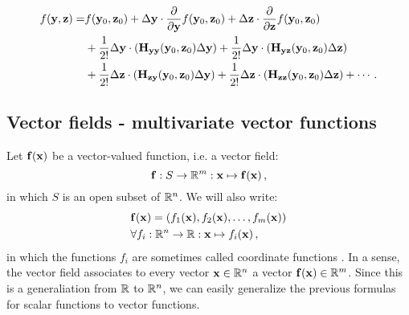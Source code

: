         \begin{equation}
            \begin{split}
                f(\vb{y}, \vb{z}) = &f(\vb{y}_0, \vb{z}_0) + \Delta \vb{y} \cdot \pdv{\vb{y}} f(\vb{y}_0, \vb{z}_0) + \Delta \vb{z} \cdot \pdv{\vb{z}} f(\vb{y}_0, \vb{z}_0) \\
                &+ \frac{1}{2!} \Delta \vb{y} \cdot (\vb{H}_{\vb{y} \vb{y}}(\vb{y}_0, \vb{z}_0) \Delta \vb{y}) + \frac{1}{2!} \Delta \vb{y} \cdot (\vb{H}_{\vb{y} \vb{z}}(\vb{y}_0, \vb{z}_0) \Delta \vb{z}) \\
                &+ \frac{1}{2!} \Delta \vb{z} \cdot (\vb{H}_{\vb{z} \vb{y}}(\vb{y}_0, \vb{z}_0) \Delta \vb{y}) + \frac{1}{2!} \Delta \vb{z} \cdot (\vb{H}_{\vb{z} \vb{z}}(\vb{y}_0, \vb{z}_0) \Delta \vb{z}) + \cdots \thinspace .
            \end{split}
        \end{equation}

    \subsection{Vector fields - multivariate vector functions}
        Let $\vb{f}(\vb{x})$ be a vector-valued function, i.e. a vector field:
        \begin{equation}
            \vb{f}: S \rightarrow \mathbb{R}^m: \vb{x} \mapsto \vb{f}(\vb{x}) \thinspace ,
        \end{equation}
        in which $S$ is an open subset of $\mathbb{R}^n$. We will also write:
        \begin{align} \label{eq:vector_field}
            &\vb{f}(\vb{x}) = (f_1(\vb{x}), f_2(\vb{x}), \dots, f_m(\vb{x})) \\
            &\forall f_i: \mathbb{R}^n \rightarrow \mathbb{R}: \vb{x} \mapsto f_i(\vb{x}) \thinspace ,
        \end{align}
        in which the functions $f_i$ are sometimes called coordinate functions \cite{Burden2011}. In a sense, the vector field associates to every vector $\vb{x} \in \mathbb{R}^n$ a vector $\vb{f}(\vb{x}) \in \mathbb{R}^m$. Since this is a generaliation from $\mathbb{R}$ to $\mathbb{R}^n$, we can easily generalize the previous formulas for scalar functions to vector functions. \\

